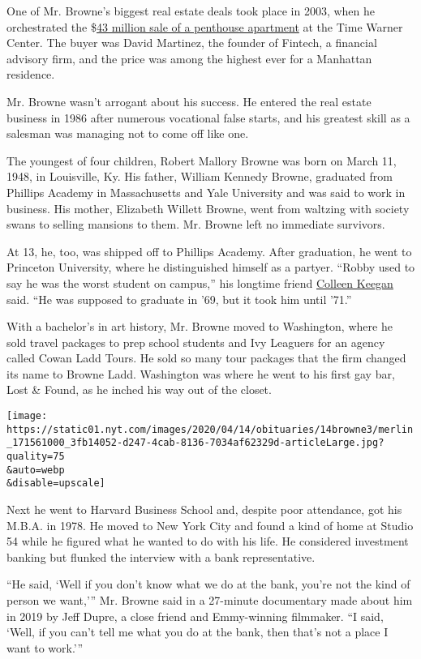 One of Mr. Browne's biggest real estate deals took place in 2003, when
he orchestrated the
\$\href{https://www.nytimes.com/2004/11/21/realestate/time-warner-center-draws-a-diverse-global-group.html}{43
million sale of a penthouse apartment} at the Time Warner Center. The
buyer was David Martinez, the founder of Fintech, a financial advisory
firm, and the price was among the highest ever for a Manhattan
residence.

Mr. Browne wasn't arrogant about his success. He entered the real estate
business in 1986 after numerous vocational false starts, and his
greatest skill as a salesman was managing not to come off like one.

The youngest of four children, Robert Mallory Browne was born on March
11, 1948, in Louisville, Ky. His father, William Kennedy Browne,
graduated from Phillips Academy in Massachusetts and Yale University and
was said to work in business. His mother, Elizabeth Willett Browne, went
from waltzing with society swans to selling mansions to them. Mr. Browne
left no immediate survivors.

At 13, he, too, was shipped off to Phillips Academy. After graduation,
he went to Princeton University, where he distinguished himself as a
partyer. ``Robby used to say he was the worst student on campus,'' his
longtime friend \href{https://fineacts.co/colleen-keegan}{Colleen
Keegan} said. ``He was supposed to graduate in '69, but it took him
until '71.''

With a bachelor's in art history, Mr. Browne moved to Washington, where
he sold travel packages to prep school students and Ivy Leaguers for an
agency called Cowan Ladd Tours. He sold so many tour packages that the
firm changed its name to Browne Ladd. Washington was where he went to
his first gay bar, Lost \& Found, as he inched his way out of the
closet.

\texttt{[image: https://static01.nyt.com/images/2020/04/14/obituaries/14browne3/merlin\_171561000\_3fb14052-d247-4cab-8136-7034af62329d-articleLarge.jpg?quality=75\\\&auto=webp\\\&disable=upscale]}

Next he went to Harvard Business School and, despite poor attendance,
got his M.B.A. in 1978. He moved to New York City and found a kind of
home at Studio 54 while he figured what he wanted to do with his life.
He considered investment banking but flunked the interview with a bank
representative.

``He said, `Well if you don't know what we do at the bank, you're not
the kind of person we want,''' Mr. Browne said in a 27-minute
documentary made about him in 2019 by Jeff Dupre, a close friend and
Emmy-winning filmmaker. ``I said, `Well, if you can't tell me what you
do at the bank, then that's not a place I want to work.'''

